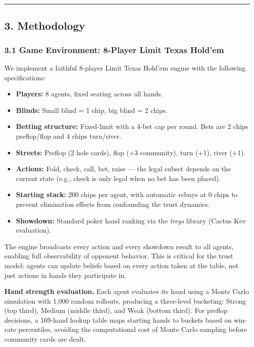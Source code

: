 \documentclass[
]{article}
\providecommand{\tightlist}{%
  \setlength{\itemsep}{0pt}\setlength{\parskip}{0pt}}
\begin{document}
\begin{center}\rule{0.5\linewidth}{0.5pt}\end{center}

\hypertarget{methodology}{%
\subsection{3. Methodology}\label{methodology}}

\hypertarget{game-environment-8-player-limit-texas-holdem}{%
\subsubsection{3.1 Game Environment: 8-Player Limit Texas
Hold'em}\label{game-environment-8-player-limit-texas-holdem}}

We implement a faithful 8-player Limit Texas Hold'em engine with the
following specifications:

\begin{itemize}
\tightlist
\item
  \textbf{Players:} 8 agents, fixed seating across all hands.
\item
  \textbf{Blinds:} Small blind = 1 chip, big blind = 2 chips.
\item
  \textbf{Betting structure:} Fixed-limit with a 4-bet cap per round.
  Bets are 2 chips preflop/flop and 4 chips turn/river.
\item
  \textbf{Streets:} Preflop (2 hole cards), flop (+3 community), turn
  (+1), river (+1).
\item
  \textbf{Actions:} Fold, check, call, bet, raise --- the legal subset
  depends on the current state (e.g., check is only legal when no bet
  has been placed).
\item
  \textbf{Starting stack:} 200 chips per agent, with automatic rebuys at
  0 chips to prevent elimination effects from confounding the trust
  dynamics.
\item
  \textbf{Showdown:} Standard poker hand ranking via the \emph{treys}
  library (Cactus Kev evaluation).
\end{itemize}

The engine broadcasts every action and every showdown result to all
agents, enabling full observability of opponent behavior. This is
critical for the trust model: agents can update beliefs based on every
action taken at the table, not just actions in hands they participate
in.

\textbf{Hand strength evaluation.} Each agent evaluates its hand using a
Monte Carlo simulation with 1,000 random rollouts, producing a
three-level bucketing: Strong (top third), Medium (middle third), and
Weak (bottom third). For preflop decisions, a 169-hand lookup table maps
starting hands to buckets based on win-rate percentiles, avoiding the
computational cost of Monte Carlo sampling before community cards are
dealt.
\end{document}
